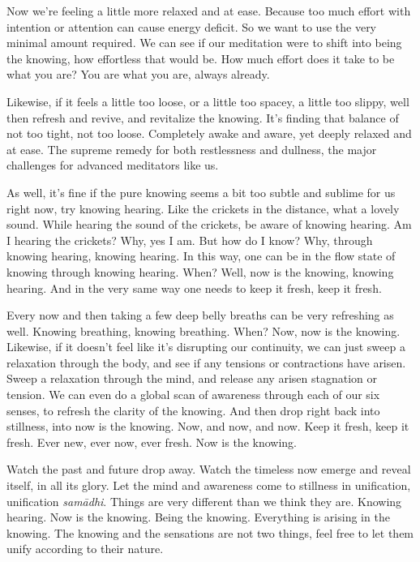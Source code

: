 \documentclass[12pt,openany]{book}
\begin{document}
Now we're feeling a little more relaxed and at ease. Because too much effort with intention or attention can cause energy deficit. So we want to use the very minimal amount required. We can see if our meditation were to shift into being the knowing, how effortless that would be. How much effort does it take to be what you are? You are what you are, always already. 

Likewise, if it feels a little too loose, or a little too spacey, a little too slippy, well then refresh and revive, and revitalize the knowing. It’s finding that balance of not too tight, not too loose. Completely awake and aware, yet deeply relaxed and at ease. The supreme remedy for both restlessness and dullness, the major challenges for advanced meditators like us.

As well, it's fine if the pure knowing seems a bit too subtle and sublime for us right now, try knowing hearing. Like the crickets in the distance, what a lovely sound. While hearing the sound of the crickets, be aware of knowing hearing. Am I hearing the crickets? Why, yes I am. But how do I know? Why, through knowing hearing, knowing hearing. In this way, one can be in the flow state of knowing through knowing hearing. When? Well, now is the knowing, knowing hearing. And in the very same way one needs to keep it fresh, keep it fresh. 

Every now and then taking a few deep belly breaths can be very refreshing as well. Knowing breathing, knowing breathing. When? Now, now is the knowing. Likewise, if it doesn’t feel like it’s disrupting our continuity, we can just sweep a relaxation through the body, and see if any tensions or contractions have arisen. Sweep a relaxation through the mind, and release any arisen stagnation or tension. We can even do a global scan of awareness through each of our six senses, to refresh the clarity of the knowing. And then drop right back into stillness, into now is the knowing. Now, and now, and now. Keep it fresh, keep it fresh. Ever new, ever now, ever fresh. Now is the knowing.

Watch the past and future drop away. Watch the timeless now emerge and reveal itself, in all its glory. Let the mind and awareness come to stillness in unification, unification \textit{samādhi}. Things are very different than we think they are. Knowing hearing. Now is the knowing. Being the knowing. Everything is arising in the knowing. The knowing and the sensations are not two things, feel free to let them unify according to their nature.
\end{document}

